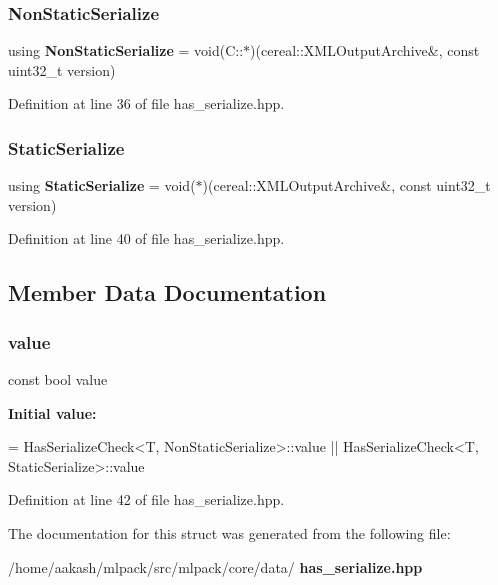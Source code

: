 \subsubsection{Non\+Static\+Serialize}
{\footnotesize\ttfamily using \textbf{ Non\+Static\+Serialize} =  void(C\+::$\ast$)(cereal\+::\+X\+M\+L\+Output\+Archive\&, const uint32\+\_\+t version)}



Definition at line 36 of file has\+\_\+serialize.\+hpp.

\mbox{\label{structmlpack_1_1data_1_1HasSerializeFunction_a4d5a24efca8a97af89629fb4f9ad2835}} 
\subsubsection{Static\+Serialize}
{\footnotesize\ttfamily using \textbf{ Static\+Serialize} =  void($\ast$)(cereal\+::\+X\+M\+L\+Output\+Archive\&, const uint32\+\_\+t version)}



Definition at line 40 of file has\+\_\+serialize.\+hpp.



\subsection{Member Data Documentation}
\mbox{\label{structmlpack_1_1data_1_1HasSerializeFunction_a11ddd051208250c32dc4985abcafa86d}} 
\subsubsection{value}
{\footnotesize\ttfamily const bool value\hspace{0.3cm}{\ttfamily [static]}}

{\bfseries Initial value\+:}
\begin{DoxyCode}
= HasSerializeCheck<T, NonStaticSerialize>::value ||
                            HasSerializeCheck<T, StaticSerialize>::value
\end{DoxyCode}


Definition at line 42 of file has\+\_\+serialize.\+hpp.



The documentation for this struct was generated from the following file\+:\begin{DoxyCompactItemize}
\item 
/home/aakash/mlpack/src/mlpack/core/data/\textbf{ has\+\_\+serialize.\+hpp}\end{DoxyCompactItemize}
